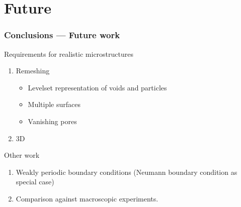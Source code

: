 \documentclass[11pt,mathserif]{beamer}
\begin{document}
\section{Future}
\begin{frame}
 \frametitle{Conclusions --- Future work}
 Requirements for realistic microstructures
 \begin{enumerate}
  \item Remeshing
  \begin{itemize}
   \item Levelset representation of voids and particles
   \item Multiple surfaces
   \item Vanishing pores
  \end{itemize}
  \item 3D
 \end{enumerate}
 Other work
 \begin{enumerate}
  \item Weakly periodic boundary conditions (Neumann boundary condition as special case)
  \item Comparison against macroscopic experiments.
 \end{enumerate}

\end{frame}

\end{document}
